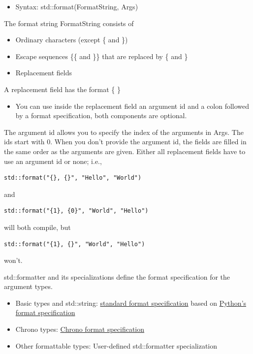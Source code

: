\begin{itemize}
\item 
Syntax: std::format(FormatString, Args)
\end{itemize}

The format string FormatString consists of

\begin{itemize}
\item 
Ordinary characters (except \{ and \})

\item 
Escape sequences \{\{ and \}\} that are replaced by \{ and \}

\item 
Replacement fields
\end{itemize}

A replacement field has the format \{ \}

\begin{itemize}
\item 
You can use inside the replacement field an argument id and a colon followed by a format specification, both components are optional.
\end{itemize}

The argument id allows you to specify the index of the arguments in Args. The ids start with 0.
When you don’t provide the argument id, the fields are filled in the same order as the arguments are given. Either all replacement fields have to use an argument id or none; i.e., 

\begin{lstlisting}[style=styleCXX]
std::format("{}, {}", "Hello", "World") 
\end{lstlisting}

and 
\begin{lstlisting}[style=styleCXX]
std::format("{1}, {0}", "World", "Hello")
\end{lstlisting}

will both compile, but 
\begin{lstlisting}[style=styleCXX]
std::format("{1}, {}", "World", "Hello") 
\end{lstlisting}

won’t.

std::formatter and its specializations define the format specification for the argument types.

\begin{itemize}
\item 
Basic types and std::string: \href{https://en.cppreference.com/w/cpp/utility/format/formatter#Standard_format_specification}{standard format specification} based on \href{ttps://docs.python.org/3/library/stdtypes.html#str.format}{Python’s format specification}

\item 
Chrono types: \href{ttps://en.cppreference.com/w/cpp/chrono/system_clock/formatter#Format_specification}{Chrono format specification}

\item 
Other formattable types: User-defined std::formatter specialization
\end{itemize}

